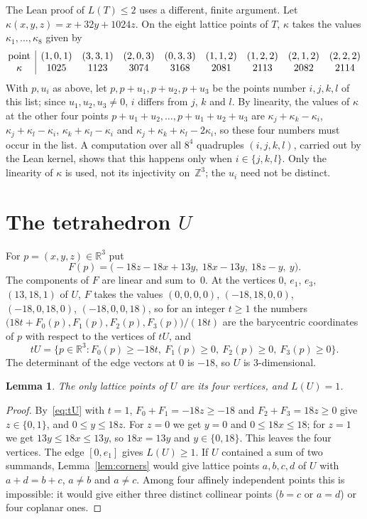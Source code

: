 \documentclass[11pt]{article}
\newtheorem{lemma}{Lemma}
\theoremstyle{definition}
\theoremstyle{remark}
\newcommand{\Z}{\mathbb Z}
\newcommand{\R}{\mathbb R}
\begin{document}
The Lean proof of $L(T)\le2$ uses a different, finite argument. Let
$\kappa(x,y,z)=x+32y+1024z$. On the eight lattice points of $T$, $\kappa$
takes the values $\kappa_1,\dots,\kappa_8$ given by
\[
\begin{array}{@{}c|cccccccc@{}}
\text{point} & (1,0,1)&(3,3,1)&(2,0,3)&(0,3,3)&(1,1,2)&(1,2,2)&(2,1,2)&(2,2,2)\\
\kappa & 1025&1123&3074&3168&2081&2113&2082&2114
\end{array}
\]
With $p,u_i$ as above, let
$p,p+u_1,p+u_2,p+u_3$ be the points number $i,j,k,l$ of this list; since
$u_1,u_2,u_3\ne0$, $i$ differs from $j$, $k$ and $l$. By linearity, the values
of $\kappa$ at the other four points $p+u_1+u_2,\dots,p+u_1+u_2+u_3$ are
$\kappa_j+\kappa_k-\kappa_i$, $\kappa_j+\kappa_l-\kappa_i$,
$\kappa_k+\kappa_l-\kappa_i$ and $\kappa_j+\kappa_k+\kappa_l-2\kappa_i$, so
these four numbers must occur in the list. A computation over all $8^4$
quadruples $(i,j,k,l)$, carried out by the Lean kernel, shows that this happens
only when $i\in\{j,k,l\}$. Only the linearity of $\kappa$
is used, not its injectivity on~$\Z^3$; the $u_i$ need not be distinct.

\section{The tetrahedron \texorpdfstring{$U$}{U}}\label{sec:U}

For $p=(x,y,z)\in\R^3$ put
\[
F(p)=\bigl(-18z-18x+13y,\ 18x-13y,\ 18z-y,\ y\bigr).
\]
The components of $F$ are linear and sum to~$0$. At the vertices $0$, $e_1$,
$e_3$, $(13,18,1)$ of $U$, $F$ takes the values $(0,0,0,0)$, $(-18,18,0,0)$,
$(-18,0,18,0)$, $(-18,0,0,18)$, so for an integer $t\ge1$ the numbers
$\bigl(18t+F_0(p),F_1(p),F_2(p),F_3(p)\bigr)/(18t)$ are the barycentric
coordinates of $p$ with respect to the vertices of $tU$, and
\begin{equation}\label{eq:tU}
tU=\{p\in\R^3 : F_0(p)\ge-18t,\ F_1(p)\ge0,\ F_2(p)\ge0,\ F_3(p)\ge0\}.
\end{equation}
The determinant of the edge vectors at $0$ is $-18$, so $U$ is
$3$-dimensional.

\begin{lemma}\label{lem:Upoints}
The only lattice points of $U$ are its four vertices, and $L(U)=1$.
\end{lemma}

\begin{proof}
By~\eqref{eq:tU} with $t=1$, $F_0+F_1=-18z\ge-18$ and $F_2+F_3=18z\ge0$ give
$z\in\{0,1\}$, and $0\le y\le18z$. For $z=0$ we get $y=0$ and $0\le18x\le18$;
for $z=1$ we get $13y\le18x\le13y$, so $18x=13y$ and $y\in\{0,18\}$. This
leaves the four vertices. The edge $[0,e_1]$ gives $L(U)\ge1$. If $U$
contained a sum of two summands, Lemma~\ref{lem:corners} would give lattice
points $a,b,c,d$ of $U$ with $a+d=b+c$, $a\ne b$ and $a\ne c$. Among four
affinely independent points this is impossible: it would give either three
distinct collinear points ($b=c$ or $a=d$) or four coplanar ones.
\end{proof}
\end{document}
